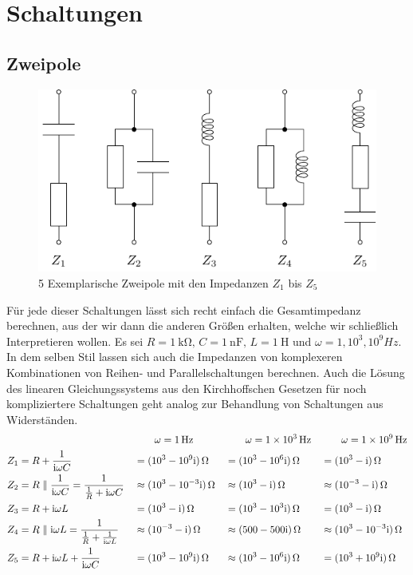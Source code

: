 \section{Schaltungen}
\subsection{Zweipole}
\begin{figure}[h!]
    \centering
    \includegraphics[scale=1.1]{elektroPhilip1.pdf}
    \caption{5 Exemplarische Zweipole mit den Impedanzen $Z_1$ bis $Z_5$}
\end{figure}
%
%
Für jede dieser Schaltungen lässt sich recht einfach die Gesamtimpedanz berechnen, aus der wir dann
die anderen Größen erhalten, welche wir schließlich Interpretieren wollen.
Es sei $R=\SI{1}{\kilo\ohm},\, C=\SI{1}{\nano\farad},\, L=\SI{1}{\henry}$ und $\omega = 1,10^3,10^{9} \si{Hz}$.
In dem selben Stil lassen sich auch die Impedanzen von komplexeren Kombinationen
von Reihen- und Parallelschaltungen berechnen. Auch die Lösung des linearen Gleichungssystems aus den Kirchhoffschen Gesetzen für noch kompliziertere Schaltungen geht analog zur Behandlung von Schaltungen aus Widerständen.
\begin{align*}
    && &\qquad \omega = \SI{1}{\Hz} &&\qquad \omega = \SI{1e3}{\Hz} &&\qquad \omega = \SI{1e9}{\Hz} \\
    Z_1 &= R + \ic 
    &&= (10^3 - 10^9 \imu)\,\si{\ohm} &&=(10^3 - 10^6 \imu)\,\si{\ohm} &&=(10^3 - \imu)\,\si{\ohm} \\
    Z_2 &= R \parallel \ic = \frac{1}{\frac{1}{R} + \imu \omega C}
    &&\approx (10^3 - 10^{-3} \imu)\,\si{\ohm} &&\approx(10^3 - \imu)\,\si{\ohm} &&\approx(10^{-3} - \imu)\,\si{\ohm} \\
    Z_3 &= R + \il 
    &&= (10^3 - \imu)\,\si{\ohm} &&=(10^3 - 10^3 \imu)\,\si{\ohm} &&=(10^3 - \imu)\,\si{\ohm} \\
    Z_4 &= R \parallel \il = \frac{1}{\frac{1}{R} + \frac{1}{\il}} 
    &&\approx (10^{-3} - \imu)\,\si{\ohm} &&\approx(500 - 500 \imu)\,\si{\ohm} &&\approx(10^3 - 10^{-3}\imu)\,\si{\ohm} \\
    Z_5 &= R + \il + \ic 
    &&= (10^3 - 10^9\imu)\,\si{\ohm} &&\approx(10^3 - 10^6 \imu)\,\si{\ohm} &&=(10^3 + 10^9\imu)\,\si{\ohm} 
\end{align*}
